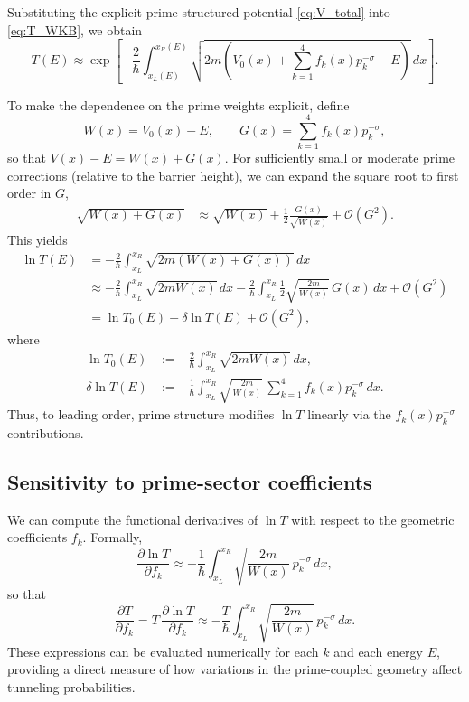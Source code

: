 \documentclass[11pt]{article}
\begin{document}
Substituting the explicit prime-structured potential \eqref{eq:V_total}
into \eqref{eq:T_WKB}, we obtain
\begin{equation}
  T(E) \approx
  \exp\left[
    -\frac{2}{\hbar}
    \int_{x_L(E)}^{x_R(E)}
    \sqrt{
      2m\left(
        V_0(x) + \sum_{k=1}^{4} f_k(x)p_k^{-\sigma} - E
      \right)
    }\,dx
  \right].
  \label{eq:T_prime_structured}
\end{equation}

To make the dependence on the prime weights explicit, define
\begin{equation}
  W(x) = V_0(x) - E, \qquad
  G(x) = \sum_{k=1}^4 f_k(x)p_k^{-\sigma},
\end{equation}
so that \(V(x)-E = W(x) + G(x)\). For sufficiently small or moderate
prime corrections (relative to the barrier height), we can expand the
square root to first order in \(G\),
\begin{align}
  \sqrt{W(x)+G(x)} 
  &\approx \sqrt{W(x)} +
    \frac{1}{2}\frac{G(x)}{\sqrt{W(x)}} + \mathcal{O}(G^2).
\end{align}
This yields
\begin{align}
  \ln T(E)
  &= -\frac{2}{\hbar}\int_{x_L}^{x_R}
     \sqrt{2m\left(W(x)+G(x)\right)}\,dx \nonumber\\
  &\approx -\frac{2}{\hbar}\int_{x_L}^{x_R}
     \sqrt{2m W(x)}\,dx
     -\frac{2}{\hbar}\int_{x_L}^{x_R}
     \frac{1}{2}\sqrt{\frac{2m}{W(x)}}\,G(x)\,dx
     + \mathcal{O}(G^2)\nonumber\\
  &= \ln T_0(E) +
     \delta \ln T(E) + \mathcal{O}(G^2),
\end{align}
where
\begin{align}
  \ln T_0(E)
  &:= -\frac{2}{\hbar}\int_{x_L}^{x_R}
      \sqrt{2m W(x)}\,dx,
  \\
  \delta \ln T(E)
  &:= -\frac{1}{\hbar}
      \int_{x_L}^{x_R}
      \sqrt{\frac{2m}{W(x)}}\,
      \sum_{k=1}^{4} f_k(x)p_k^{-\sigma}\,dx.
\end{align}
Thus, to leading order, prime structure modifies \(\ln T\) linearly via
the \(f_k(x)p_k^{-\sigma}\) contributions.

\subsection{Sensitivity to prime-sector coefficients}

We can compute the functional derivatives of \(\ln T\) with respect to
the geometric coefficients \(f_k\). Formally,
\begin{equation}
  \frac{\partial \ln T}{\partial f_k}
  \approx
  -\frac{1}{\hbar}
  \int_{x_L}^{x_R}
  \sqrt{\frac{2m}{W(x)}}\,p_k^{-\sigma}\,dx,
  \label{eq:dlnT_dfk}
\end{equation}
so that
\begin{equation}
  \frac{\partial T}{\partial f_k}
  = T\,\frac{\partial \ln T}{\partial f_k}
  \approx
  -\frac{T}{\hbar}
  \int_{x_L}^{x_R}
  \sqrt{\frac{2m}{W(x)}}\,p_k^{-\sigma}\,dx.
  \label{eq:dT_dfk}
\end{equation}
These expressions can be evaluated numerically for each \(k\) and each
energy \(E\), providing a direct measure of how variations in the
prime-coupled geometry affect tunneling probabilities.
\end{document}
